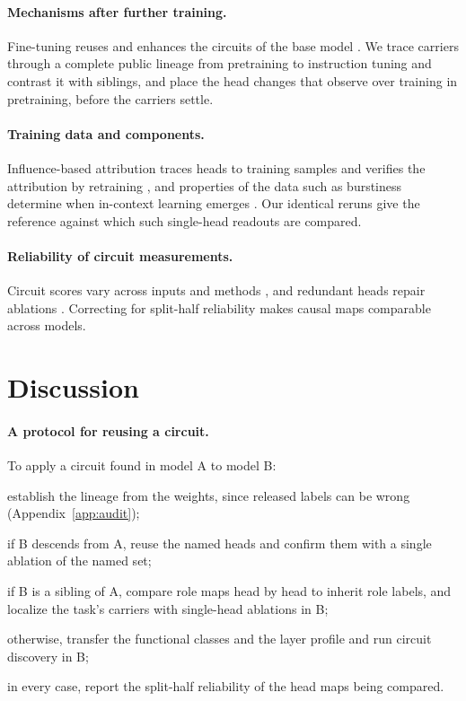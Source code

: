 \documentclass[11pt]{article}
\begin{document}
\paragraph{Mechanisms after further training.}
Fine-tuning reuses and enhances the circuits of the base model \citep{prakash2024finetuning}.
We trace carriers through a complete public lineage from pretraining to instruction tuning and contrast it with siblings, and place the head changes that \citet{tigges2024llm} observe over training in pretraining, before the carriers settle.

\paragraph{Training data and components.}
Influence-based attribution traces heads to training samples and verifies the attribution by retraining \citep{chen2026mechanistic}, and properties of the data such as burstiness determine when in-context learning emerges \citep{chan2022data}.
Our identical reruns give the reference against which such single-head readouts are compared.

\paragraph{Reliability of circuit measurements.}
Circuit scores vary across inputs and methods \citep{meloux2026statistical}, and redundant heads repair ablations \citep{mcgrath2023hydra}.
Correcting for split-half reliability makes causal maps comparable across models.

\section{Discussion}
\label{sec:discussion}

\paragraph{A protocol for reusing a circuit.}
To apply a circuit found in model A to model B:
\begin{enumerate*}[label=(\roman*)]
\item establish the lineage from the weights, since released labels can be wrong (Appendix~\ref{app:audit});
\item if B descends from A, reuse the named heads and confirm them with a single ablation of the named set;
\item if B is a sibling of A, compare role maps head by head to inherit role labels, and localize the task's carriers with single-head ablations in B;
\item otherwise, transfer the functional classes and the layer profile and run circuit discovery in B;
\item in every case, report the split-half reliability of the head maps being compared.
\end{enumerate*}
\end{document}
